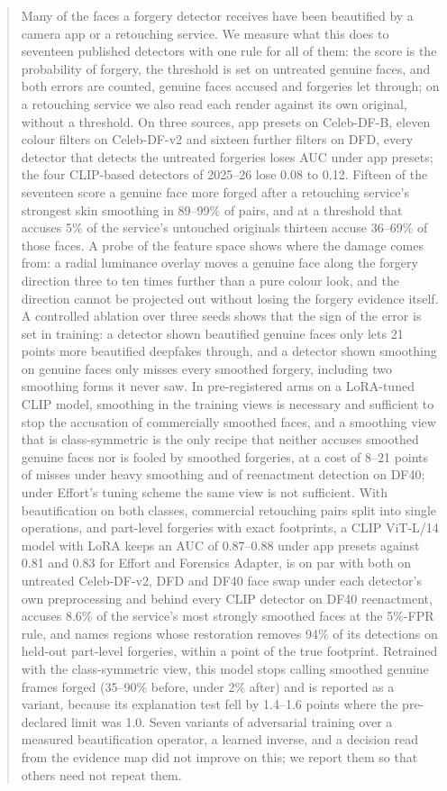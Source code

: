 \documentclass[conference]{IEEEtran}
\begin{document}
\begin{abstract}
Many of the faces a forgery detector receives have been beautified by a camera app or a retouching service. We measure
what this does to seventeen published detectors with one rule for all of them: the score is the probability of forgery,
the threshold is set on untreated genuine faces, and both errors are counted, genuine faces accused and forgeries let
through; on a retouching service we also read each render against its own original, without a threshold. On three
sources, app presets on Celeb-DF-B, eleven colour filters on Celeb-DF-v2 and sixteen further filters on DFD, every
detector that detects the untreated forgeries loses AUC under app presets; the four CLIP-based detectors of 2025--26
lose 0.08 to 0.12. Fifteen of the seventeen score a genuine face more forged after a retouching service's strongest
skin smoothing in 89--99\% of pairs, and at a threshold that accuses 5\% of the service's untouched originals thirteen
accuse 36--69\% of those faces. A probe of the feature space shows where the damage comes from: a radial luminance
overlay moves a genuine face along the forgery direction three to ten times further than a pure colour look, and the
direction cannot be projected out without losing the forgery evidence itself. A controlled ablation over three seeds
shows that the sign of the error is set in training: a detector shown beautified genuine faces only lets 21 points more
beautified deepfakes through, and a detector shown smoothing on genuine faces only misses every smoothed forgery,
including two smoothing forms it never saw. In pre-registered arms on a LoRA-tuned CLIP model, smoothing in the training
views is necessary and sufficient to stop the accusation of commercially smoothed faces, and a smoothing view that is
class-symmetric is the only recipe that neither accuses smoothed genuine faces nor is fooled by smoothed forgeries, at
a cost of 8--21 points of misses under heavy smoothing and of reenactment detection on DF40; under Effort's tuning
scheme the same view is not sufficient. With beautification on both classes, commercial retouching pairs split into
single operations, and part-level forgeries with exact footprints, a CLIP ViT-L/14 model with LoRA keeps an AUC of
0.87--0.88 under app presets against 0.81 and 0.83 for Effort and Forensics Adapter, is on par with both on untreated
Celeb-DF-v2, DFD and DF40 face swap under each detector's own preprocessing and behind every CLIP detector on DF40
reenactment, accuses 8.6\% of the service's most strongly smoothed faces at the 5\%-FPR rule, and names regions whose
restoration removes 94\% of its detections on held-out part-level forgeries, within a point of the true footprint.
Retrained with the class-symmetric view, this model stops calling smoothed genuine frames forged (35--90\% before,
under 2\% after) and is reported as a variant, because its explanation test fell by 1.4--1.6 points where the
pre-declared limit was 1.0. Seven variants of adversarial training over a measured
beautification operator, a learned inverse, and a decision read from the evidence map did not improve on this; we
report them so that others need not repeat them.
\end{abstract}
\end{document}
